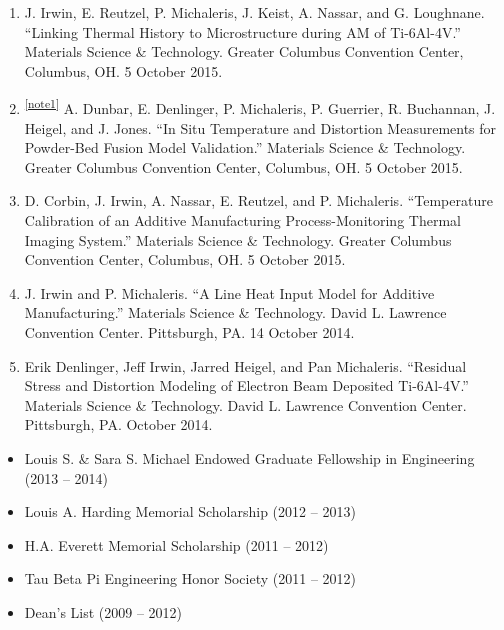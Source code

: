 \documentclass[10.5pt,letterpaper]{article}
\begin{document}
\begin{enumerate}[leftmargin=*]
	\item J. Irwin, E. Reutzel, P. Michaleris, J. Keist, A. Nassar, and G. Loughnane. ``Linking Thermal History to Microstructure during AM of Ti-6Al-4V.'' Materials Science \& Technology. Greater Columbus Convention Center, Columbus, OH. 5 October 2015.
	\item \textsuperscript{\ref{note1}} A. Dunbar, E. Denlinger, P. Michaleris, P. Guerrier, R. Buchannan, J. Heigel, and J. Jones. ``In Situ Temperature and Distortion Measurements for Powder-Bed Fusion Model Validation.'' Materials Science \& Technology. Greater Columbus Convention Center, Columbus, OH. 5 October 2015.
	\item D. Corbin, J. Irwin, A. Nassar, E. Reutzel, and P. Michaleris. ``Temperature Calibration of an Additive Manufacturing Process-Monitoring Thermal Imaging System.'' Materials Science \& Technology. Greater Columbus Convention Center, Columbus, OH. 5 October 2015.
	\item J. Irwin and P. Michaleris. ``A Line Heat Input Model for Additive Manufacturing.'' Materials Science \& Technology. David L. Lawrence Convention Center. Pittsburgh, PA. 14 October 2014.
	\item Erik Denlinger, Jeff Irwin, Jarred Heigel, and Pan Michaleris.  ``Residual Stress and Distortion Modeling of Electron Beam Deposited Ti-6Al-4V.''  Materials Science \& Technology.  David L. Lawrence Convention Center.  Pittsburgh, PA.  October 2014.
\end{enumerate}

\spacedhrule{0.5em}{-0.5em}
\begin{itemize}
	\setlength{\parskip}{0em}
	\item Louis S. \& Sara S. Michael Endowed Graduate Fellowship in Engineering (2013 -- 2014)
	\item Louis A. Harding Memorial Scholarship (2012 -- 2013)
	\item H.A. Everett Memorial Scholarship (2011 -- 2012)
	\item Tau Beta Pi Engineering Honor Society (2011 -- 2012)
	\item Dean's List (2009 -- 2012)
\end{itemize}
\end{document}
